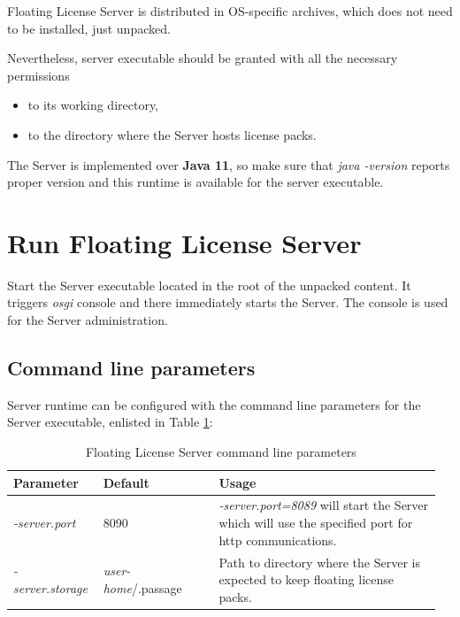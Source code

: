 \documentclass[12pt]{report}
\begin{document}
Floating License Server is distributed in OS-specific archives, which does not need to be installed, just unpacked. 

Nevertheless, server executable should be granted with all the necessary permissions
\begin{itemize}
  \item to its working directory,
  \item to the directory where the Server hosts license packs.
\end{itemize} 

The Server is implemented over \textbf{Java 11}, 
so make sure that \textit {java -version} reports proper version and this runtime is available for the server executable.

\chapter*{Run Floating License Server} \label{ch:run-fls}

Start the Server executable located in the root of the unpacked content. 
It triggers \textit{osgi} console and there immediately starts the Server. The console is used for the Server administration.

\section*{Command line parameters} \label{ch:run-fls-cli}

Server runtime can be configured with the command line parameters for the Server executable, enlisted in Table \ref{tabular:server-params}:

\begin{table}[ht]
\caption{Floating License Server command line parameters}
\label{tabular:server-params}
\begin{center}
	\begin{tabular}{p{0.2\linewidth}p{0.26\linewidth}p{0.5\linewidth}}
		\textbf{Parameter} & \textbf{Default} & \textbf{Usage} \\  \hline
		\textit{-server.port} & 8090 & \textit{-server.port=8089} will start the Server which will use the specified port for http communications.\\  \hline
		\textit{-server.storage} & \textit{user-home}/.passage & Path to directory where the Server is expected to keep floating license packs. \\  \hline
	\end{tabular}
\end{center}
\end{table}
\end{document}
